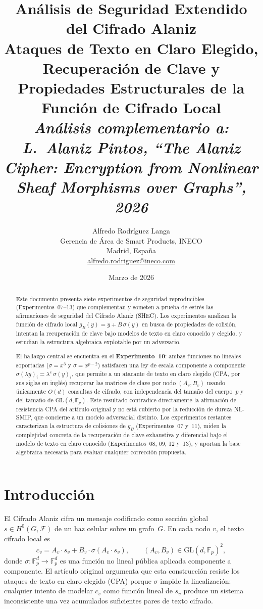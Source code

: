 \documentclass[12pt,a4paper]{article}
\title{%
  \textbf{Análisis de Seguridad Extendido del Cifrado Alaniz}\\[6pt]
  \large Ataques de Texto en Claro Elegido, Recuperación de Clave y\\
  Propiedades Estructurales de la Función de Cifrado Local\\[4pt]
  \normalsize\textit{Análisis complementario a: L.~Alaniz Pintos,
  ``The Alaniz Cipher: Encryption from Nonlinear Sheaf Morphisms
  over Graphs'', 2026}
}
\author{%
  Alfredo Rodr\'iguez Langa\\[4pt]
  \normalsize Gerencia de Área de Smart Products, INECO\\
  \normalsize Madrid, España\\[2pt]
  \small \href{mailto:alfredo.rodriguez@ineco.com}{alfredo.rodriguez@ineco.com}
}
\date{Marzo de 2026}
\theoremstyle{definition}
\newcommand{\Fp}{\mathbb{F}_p}
\newcommand{\GL}{\mathrm{GL}}
\newcommand{\Hzero}{H^{0}}
\newcommand{\calF}{\mathcal{F}}
\begin{document}
\maketitle
\thispagestyle{fancy}

\begin{abstract}
Este documento presenta siete experimentos de seguridad reproducibles
(Experimentos~07--13) que complementan y someten a prueba de estrés
las afirmaciones de seguridad del Cifrado Alaniz (SHEC). Los experimentos
analizan la función de cifrado local $g_B(y) = y + B\,\sigma(y)$
en busca de propiedades de colisión, intentan la recuperación de clave
bajo modelos de texto en claro conocido y elegido, y estudian la
estructura algebraica explotable por un adversario.

El hallazgo central se encuentra en el \textbf{Experimento~10}: ambas
funciones no lineales soportadas ($\sigma = x^3$ y $\sigma = x^{p-2}$)
satisfacen una ley de escala componente a componente
$\sigma(\lambda y)_i = \lambda^e\,\sigma(y)_i$, que permite a un
atacante de texto en claro elegido (CPA, por sus siglas en inglés)
recuperar las matrices de clave por nodo $(A_v, B_v)$ usando únicamente
$O(d)$ consultas de cifrado, con independencia del tamaño del
cuerpo~$p$ y del tamaño de $\GL(d,\Fp)$.
Este resultado contradice directamente la afirmación de resistencia CPA
del artículo original y no está cubierto por la reducción de dureza
NL-SMIP, que concierne a un modelo adversarial distinto.
Los experimentos restantes caracterizan la estructura de colisiones de
$g_B$ (Experimentos~07 y~11), miden la complejidad concreta de la
recuperación de clave exhaustiva y diferencial bajo el modelo de texto
en claro conocido (Experimentos~08, 09, 12 y~13), y aportan la base
algebraica necesaria para evaluar cualquier corrección propuesta.
\end{abstract}

\tableofcontents
\newpage

\section{Introducción}

El Cifrado Alaniz cifra un mensaje codificado como sección global
$s \in \Hzero(G, \calF)$ de un haz celular sobre un grafo~$G$.
En cada nodo $v$, el texto cifrado local es
\begin{equation}\label{eq:cifrado}
  c_v = A_v \cdot s_v + B_v \cdot \sigma(A_v \cdot s_v),
  \qquad (A_v, B_v) \in \GL(d, \Fp)^2,
\end{equation}
donde $\sigma : \Fp^d \to \Fp^d$ es una función no lineal pública
aplicada componente a componente. El artículo original argumenta que
esta construcción resiste los ataques de texto en claro elegido (CPA)
porque $\sigma$ impide la linealización: cualquier intento de modelar
$c_v$ como función lineal de $s_v$ produce un sistema inconsistente
una vez acumulados suficientes pares de texto cifrado.
\end{document}
